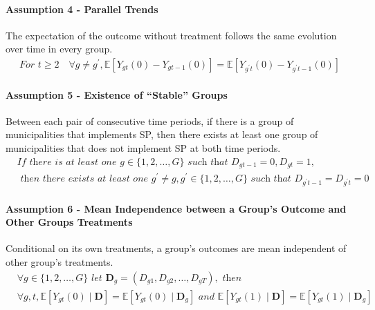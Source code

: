 \documentclass[10pt, oneside]{book}
\begin{document}
\paragraph{Assumption 4 - Parallel Trends} The expectation of the outcome without treatment follows the same evolution over time in every group.
\begin{align*}
    \textit{For } t\geq 2 \quad \forall g \neq g^{'}, \mathbb{E}[Y_{gt}(0) - Y_{gt-1}(0)] = \mathbb{E}[Y_{g^{'}t}(0) - Y_{g^{'}t-1}(0)]
\end{align*}

\paragraph{Assumption 5 - Existence of ``Stable'' Groups} Between each pair of consecutive time periods, if there is a group of municipalities that implements SP, then there exists at least one group of municipalities that does not implement SP at both time periods.
\begin{align*}
    & \textit{If there is at least one } g \in \{1,2, \dots, G\} \textit{ such that } D_{gt-1} = 0, D_{gt} = 1,\\
    & \textit{ then there exists at least one } g^{'} \neq g, g^{'} \in \{1, 2, \dots, G\} \textit{ such that } D_{g^{'}t-1} = D_{g^{'}t} = 0
\end{align*}

\paragraph{Assumption 6 - Mean Independence between a Group's Outcome and Other Groups Treatments} Conditional on its own treatments, a group's outcomes are mean independent of other group's treatments.
\begin{align*}
&\forall g \in \{1, 2, \dots, G\} \textit{ let } \mathbf{D}_g = (D_{g1}, D_{g2}, \dots, D_{gT}), \textit{ then } \\
& \forall g, t, \mathbb{E}[Y_{gt}(0) \mid \mathbf{D}] = \mathbb{E}[Y_{gt}(0) \mid \mathbf{D}_g] \textit{ and } \mathbb{E}[Y_{gt}(1) \mid \mathbf{D}] = \mathbb{E}[Y_{gt}(1) \mid \mathbf{D}_g]
\end{align*}
\end{document}
